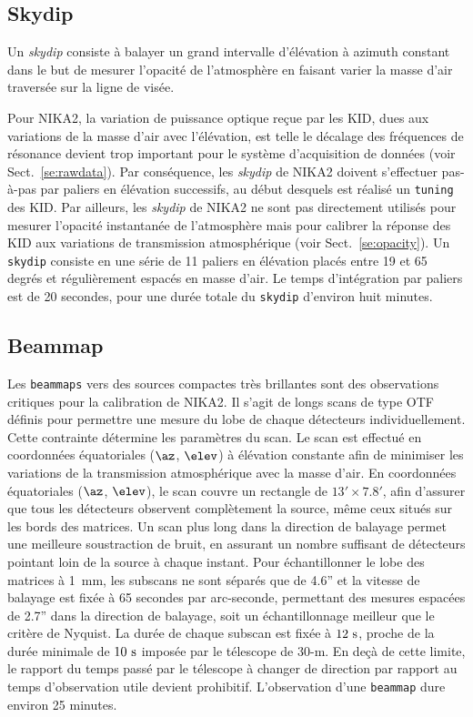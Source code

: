 \subsection{Skydip}
\label{se:skydip}

Un \emph{skydip} consiste à balayer un grand intervalle d'élévation à
azimuth constant dans le but de mesurer l'opacité de l'atmosphère en
faisant varier la masse d'air traversée sur la ligne de visée. 

Pour NIKA2, la variation de puissance optique reçue par les KID, dues
aux variations de la masse d'air avec l'élévation, est telle le décalage des
fréquences de résonance devient trop important pour le système
d'acquisition de données (voir Sect.~\ref{se:rawdata}). Par
conséquence, les \emph{skydip} de NIKA2 doivent s'effectuer pas-à-pas
par paliers en élévation successifs, au début desquels est réalisé un
{\tt tuning} des KID. Par ailleurs, les \emph{skydip} de NIKA2 ne sont
pas directement utilisés pour mesurer l'opacité instantanée de
l'atmosphère mais pour calibrer la réponse des KID aux variations de
transmission atmosphérique (voir Sect.~\ref{se:opacity}). Un {\tt skydip}
consiste en une série de 11 paliers en élévation placés entre 19 et 65
degrés et régulièrement espacés en masse d'air. Le temps d'intégration
par paliers est de 20 secondes, pour une durée totale du {\tt skydip}
d'environ huit minutes.

\subsection{Beammap}
\label{se:beammap}

Les {\tt beammaps} vers des sources compactes très brillantes sont des
observations critiques pour la calibration de NIKA2. Il s'agit de
longs scans de type OTF définis pour permettre une mesure du lobe de
chaque détecteurs individuellement. Cette contrainte détermine les
paramètres du scan. Le scan est effectué en coordonnées équatoriales
($\az$, $\elev$) à élévation constante afin de minimiser les
variations de la transmission atmosphérique avec la masse d'air. En
coordonnées équatoriales ($\az$, $\elev$), le scan couvre un rectangle
de $13' \times 7.8'$, afin d'assurer que tous
les détecteurs observent complètement la source, même ceux situés
sur les bords des matrices. Un scan plus long dans la direction de
balayage permet une meilleure soustraction de bruit, en assurant un
nombre suffisant de détecteurs pointant loin de la source à chaque
instant. Pour échantillonner le lobe des matrices à 1~mm,
les subscans ne sont séparés que de 4.6'' et la vitesse de balayage
est fixée à 65 secondes par arc-seconde, permettant des mesures
espacées de 2.7'' dans la direction de balayage, soit un
échantillonnage meilleur que le critère de Nyquist. La durée de chaque
subscan est fixée à $12~\rm{s}$, proche de la durée minimale de
$10~\rm{s}$ imposée par le télescope de 30-m. En deçà de cette limite,
le rapport du temps passé par le télescope à changer de direction par
rapport au temps d'observation utile devient prohibitif. L'observation
d'une {\tt beammap} dure environ 25 minutes. 



